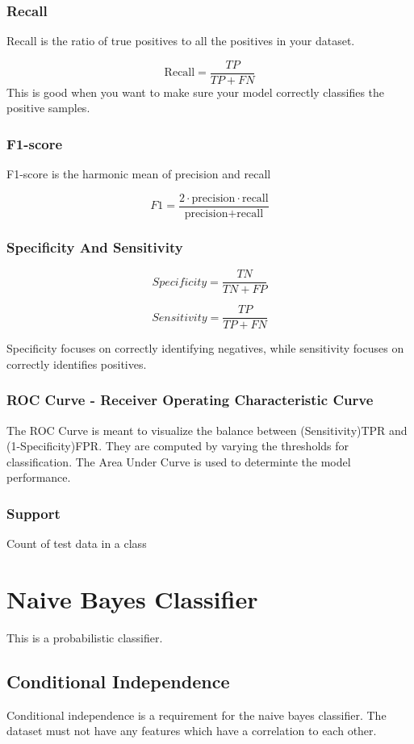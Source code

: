 \documentclass[11pt]{article}
\begin{document}
\subsubsection{Recall}
\label{sec:orge373331}
Recall is the ratio of true positives to all the positives in your dataset.

\[\text{Recall} = \frac{TP}{TP + FN}\]
This is good when you want to make sure your model correctly classifies the positive samples.
\subsubsection{F1-score}
\label{sec:org03144a1}
F1-score is the harmonic mean of precision and recall

\[
F1 = \frac{2 \cdot \text{precision} \cdot \text{recall}}{\text{precision} + \text{recall}}
\]
\subsubsection{Specificity And Sensitivity}
\label{sec:org553fd7b}
$$
Specificity = \frac{TN}{TN+FP}
$$

$$
Sensitivity = \frac{TP}{TP+ FN}
$$

Specificity focuses on correctly identifying negatives, while sensitivity focuses on correctly identifies positives.
\subsubsection{ROC Curve - Receiver Operating Characteristic Curve}
\label{sec:org04c0bb5}
The ROC Curve is meant to visualize the balance between (Sensitivity)TPR and (1-Specificity)FPR. They are computed by varying the thresholds for classification. The Area Under Curve is used to determinte the model performance.
\subsubsection{Support}
\label{sec:orgb12b45b}
Count of test data in a class
\section{Naive Bayes Classifier}
\label{sec:org7f0d2ea}
This is a probabilistic classifier.
\subsection{Conditional Independence}
\label{sec:org90280c9}
Conditional independence is a requirement for the naive bayes classifier. The dataset must not have any features which have a correlation to each other.
\end{document}
